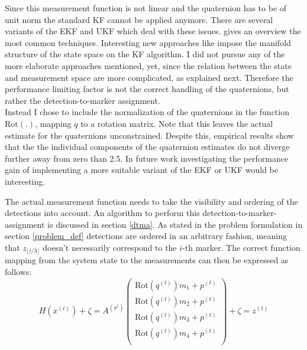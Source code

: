 \documentclass[12pt,a4paper]{article}
\begin{document}
Since this measurement function is not linear and the quaternion has to be of unit norm the standard KF cannot be applied anymore. There are several variants of the EKF and UKF which deal with these issues. \cite{attitude_estimation} gives an overview the most common techniques. Interesting new approaches like \cite{manifolds} impose the manifold structure of the state space on the KF algorithm. %
I did not pursue any of the more elaborate approaches mentioned, yet, since the relation between the state and measurement space are more complicated, as explained next. Therefore the performance limiting factor is not the correct handling of the quaternions, but rather the detection-to-marker assignment.\\
Instead I chose to include the normalization of the quaternions in the function $\text{Rot}(.)$, mapping $q$ to a rotation matrix. %
 Note that this leaves the actual estimate for the quaternions unconstrained. Despite this, empirical results show that the the individual components of the quaternion estimates do not diverge further away from zero than 2.5. In future work investigating the performance gain of implementing a more suitable variant of the EKF or UKF would be interesting.

The actual measurement function needs to take the visibility and ordering of the detections into account. An algorithm to perform this detection-to-marker-assignment is discussed in section \ref{dtma}.
As stated in the problem formulation in section \ref{problem_def} detections are ordered in an arbitrary fashion, meaning that $z_{\lfloor i / 3 \rfloor}$ doesn't necessarily correspond to the $i\text{-th}$ marker. The correct function mapping from the system state to the measurements can then be expressed as follows:
\begin{equation}
H(x^{(t)}) + \zeta=
A^{(\pi^{t})} \begin{pmatrix}
\text{Rot}(q^{(t)})m_1 + p^{(t)} \\
\text{Rot}(q^{(t)})m_2 + p^{(t)} \\
\text{Rot}(q^{(t)})m_3 + p^{(t)} \\
\text{Rot}(q^{(t)})m_4 + p^{(t)} \\
\end{pmatrix} + \zeta
= z^{(t)} 
\end{equation}
\end{document}
